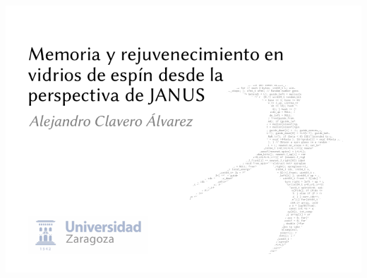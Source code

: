 \documentclass{beamer}
\begin{document}
\begin{frame}
  \includegraphics[width=\textwidth]{images/beamer_title.pdf}
\end{frame}
\end{document}
